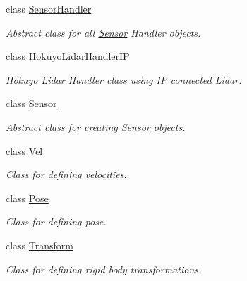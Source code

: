 \begin{DoxyCompactItemize}
class \hyperlink{classrlib_1_1SensorHandler}{Sensor\-Handler}
\begin{DoxyCompactList}\small\item\em Abstract class for all \hyperlink{classrlib_1_1Sensor}{Sensor} Handler objects. \end{DoxyCompactList}\item 
class \hyperlink{classrlib_1_1HokuyoLidarHandlerIP}{Hokuyo\-Lidar\-Handler\-I\-P}
\begin{DoxyCompactList}\small\item\em Hokuyo Lidar Handler class using I\-P connected Lidar. \end{DoxyCompactList}\item 
class \hyperlink{classrlib_1_1Sensor}{Sensor}
\begin{DoxyCompactList}\small\item\em Abstract class for creating \hyperlink{classrlib_1_1Sensor}{Sensor} objects. \end{DoxyCompactList}\item 
class \hyperlink{classrlib_1_1Vel}{Vel}
\begin{DoxyCompactList}\small\item\em Class for defining velocities. \end{DoxyCompactList}\item 
class \hyperlink{classrlib_1_1Pose}{Pose}
\begin{DoxyCompactList}\small\item\em Class for defining pose. \end{DoxyCompactList}\item 
class \hyperlink{classrlib_1_1Transform}{Transform}
\begin{DoxyCompactList}\small\item\em Class for defining rigid body transformations. \end{DoxyCompactList}\end{DoxyCompactItemize}
